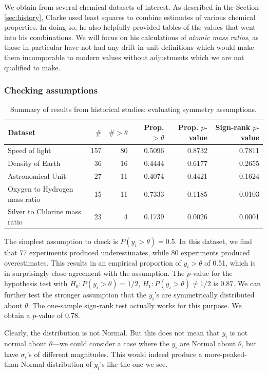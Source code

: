 \documentclass[12pt]{article}
\begin{document}
We obtain from \citet{clarke1910recalculation} several chemical datasets of interest. As described in the Section \ref{sec:history}, Clarke used least squares to combine estimates of various chemical properties. In doing so, he also helpfully provided tables of the values that went into his combinations. We will focus on his calculations of \textit{atomic mass ratios}, as those in particular have not had any drift in unit definitions which would make them incomporable to modern values without adjustments which we are not qualified to make.

\subsubsection{Checking assumptions}

\begin{table}
  \centering
  \caption{Summary of results from historical studies: evaluating symmetry assumptions.}
  \smaller
  \begin{tabular}{l|rrrrr}
    Dataset & $\#$ & $\#>\theta$ & Prop. $>\theta$ & Prop. $p$-value & Sign-rank $p$-value \\\hline
    Speed of light & 157 & 80 & 0.5096 & 0.8732 & 0.7811 \\
    Density of Earth & 36 & 16 & 0.4444 & 0.6177 & 0.2655 \\
    Astronomical Unit & 27 & 11 & 0.4074 & 0.4421 & 0.1624 \\
    Oxygen to Hydrogen mass ratio & 15 & 11 & 0.7333 & 0.1185 & 0.0103 \\
    Silver to Chlorine mass ratio & 23 & 4 & 0.1739 & 0.0026 & 0.0001 \\
  \end{tabular}
\end{table}

The simplest assumption to check is $P(y_i>\theta)=0.5$. In this dataset, we find that 77 experiments produced underestimates, while 80 experiments produced overestimates. This results in an empirical proportion of $y_i>\theta$ of 0.51, which is in surprisingly close agreement with the assumption. The $p$-value for the hypothesis test with $H_0: P(y_i>\theta)=1/2$, $H_1: P(y_i>\theta)\neq 1/2$ is $0.87$. We can further test the stronger assumption that the $y_i$'s are symmetrically distributed about $\theta$. The one-sample sign-rank test actually works for this purpose. We obtain a $p$-value of $0.78$.

Clearly, the distribution is not Normal. But this does not mean that $y_i$ is not normal about $\theta$---we could consider a case where the $y_i$ are Normal about $\theta$, but have $\sigma_i$'s of different magnitudes. This would indeed produce a more-peaked-than-Normal distribution of $y_i$'s like the one we see.
\end{document}
